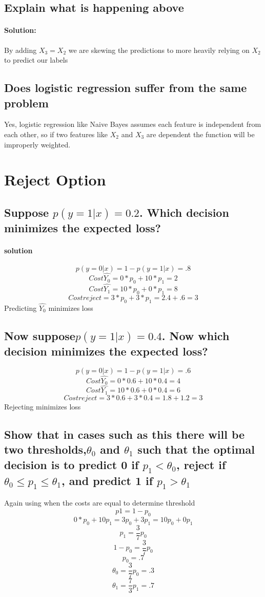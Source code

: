 \documentclass{article}
\begin{document}
\subsection{Explain what is happening above}
\paragraph{Solution:}
By adding $X_3 = X_2$ we are skewing the predictions to more heavily relying on $X_2$ to predict our labels 
 
\subsection{Does logistic regression suffer from the same problem}
Yes, logistic regression like Naive Bayes assumes each feature is independent from each other, so if two features like $X_2$ and $X_3$ are dependent the function will be improperly weighted. 

\section{Reject Option}
\subsection{Suppose $p(y = 1|x) = 0.2$. Which decision minimizes the expected loss?}
\paragraph{solution}
$$p(y =0|x) = 1 -p(y =1|x) = .8 $$
$$ Cost \hat{Y_0}  = 0 *p_0 +10*p_1  = 2$$
$$Cost \hat{Y_1} = 10*p_0 + 0 *p_1 = 8 $$ 
$$Cost reject =  3*p_0 +3*p_1  = 2.4 + .6 = 3$$ 
Predicting $\hat{Y_0} $ minimizes loss

\subsection{Now suppose$ p(y = 1|x) = 0.4$. Now which decision minimizes the expected loss?}

$$p(y =0|x) = 1 -p(y =1|x) = .6 $$
$$ Cost \hat{Y_0}  = 0 *0.6 +10*0.4 = 4$$
$$Cost \hat{Y_1} = 10*0.6 + 0 *0.4 = 6 $$ 
$$Cost reject =  3*0.6 +3*0.4  = 1.8 + 1.2 = 3$$ 
Rejecting minimizes loss

\subsection{Show that in cases such as this there will be two thresholds,$\theta{_0}$ and $\theta{_1}$ such that the optimal decision is to predict 0 if $p_1 < \theta{_0}$, reject if $\theta{_0} \leq p_1 \leq \theta{_1}$, and predict 1 if $p_1 > \theta{_1}$}
Again using when the costs are equal to determine threshold 
$$p1 = 1 - p_0$$
$$ 0*p_0 +10p_1 = 3p_0 + 3p_1 = 10p_0 + 0p_1$$
$$p_1 = \frac{3}{7}p_0 $$
$$1-p_0 = \frac{3}{7}p_0 $$ 
$$p_0 = .7 $$
$$\theta{_0} = \frac{3}{7}p_0  = .3 $$
$$\theta{_1} = \frac{7}{3}p_1 = .7 $$
\end{document}
